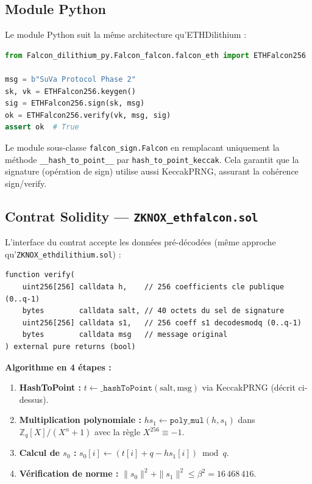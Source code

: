\documentclass[11pt,a4paper]{article}
\newcommand{\ring}{\mathbb{Z}_q[X]/(X^n+1)}
\begin{document}
\subsection{Module Python}

Le module Python suit la même architecture qu'ETHDilithium :

\begin{lstlisting}[language=Python,caption={Utilisation d'ETHFalcon256}]
from Falcon_dilithium_py.Falcon_falcon.falcon_eth import ETHFalcon256

msg = b"SuVa Protocol Phase 2"
sk, vk = ETHFalcon256.keygen()
sig = ETHFalcon256.sign(sk, msg)
ok = ETHFalcon256.verify(vk, msg, sig)
assert ok  # True
\end{lstlisting}

Le module sous-classe \texttt{falcon\_sign.Falcon} en remplacant uniquement
la méthode \texttt{\_\_hash\_to\_point\_\_} par \texttt{hash\_to\_point\_keccak}.
Cela garantit que la signature (opération de sign) utilise aussi KeccakPRNG,
assurant la cohérence sign/verify.

\subsection{Contrat Solidity — \texttt{ZKNOX\_ethfalcon.sol}}

L'interface du contrat accepte les données pré-décodées (même approche
qu'\texttt{ZKNOX\_ethdilithium.sol}) :

\begin{lstlisting}[language=Solidity,caption={Interface verify()}]
function verify(
    uint256[256] calldata h,    // 256 coefficients cle publique (0..q-1)
    bytes        calldata salt, // 40 octets du sel de signature
    uint256[256] calldata s1,   // 256 coeff s1 decodesmodq (0..q-1)
    bytes        calldata msg   // message original
) external pure returns (bool)
\end{lstlisting}

\textbf{Algorithme en 4 étapes :}
\begin{enumerate}
  \item \textbf{HashToPoint :} $t \leftarrow \texttt{\_hashToPoint}(\mathrm{salt}, \mathrm{msg})$
        via KeccakPRNG (décrit ci-dessus).
  \item \textbf{Multiplication polynomiale :}
        $hs_1 \leftarrow \texttt{poly\_mul}(h, s_1)$
        dans $\ring$ avec la règle $X^{256} \equiv -1$.
  \item \textbf{Calcul de $s_0$ :}
        $s_0[i] \leftarrow (t[i] + q - hs_1[i]) \bmod q$.
  \item \textbf{Vérification de norme :}
        $\|s_0\|^2 + \|s_1\|^2 \leq \beta^2 = 16\,468\,416$.
\end{enumerate}
\end{document}
